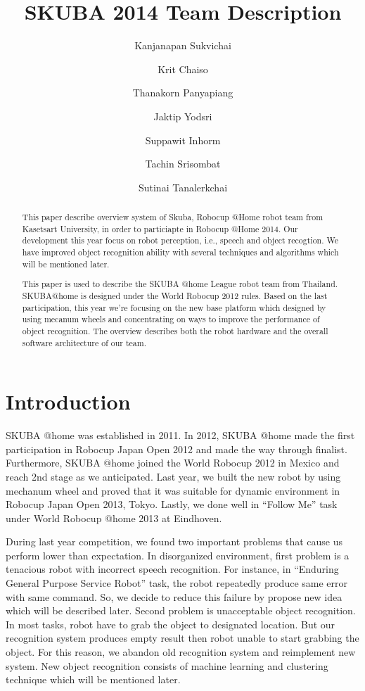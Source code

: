 \documentclass{llncs}
\newcommand{\dq}[1]{``#1''}
\begin{document}
\title{SKUBA 2014 Team Description}
\author{Kanjanapan Sukvichai
\and Krit Chaiso
\and Thanakorn Panyapiang
\and Jaktip Yodsri
\and Suppawit Inhorm
\and Tachin Srisombat
\and Sutinai Tanalerkchai
}


\maketitle

\begin{abstract}
This paper describe overview system of Skuba, Robocup @Home robot team from Kasetsart University, in order to particiapte in Robocup @Home 2014. Our development this year focus on robot perception, i.e., speech and object recogtion. We have improved object recognition ability with several techniques and algorithms which will be mentioned later. 

This paper is used to describe the SKUBA @home League robot team from Thailand.
SKUBA@home is designed under the World Robocup 2012 rules. 
Based on the last participation, this year we're focusing on the new base platform which designed by using mecanum wheels and concentrating on ways to improve the performance of object recognition.
The overview describes both the robot hardware and the overall software architecture of our team.
\end{abstract}

\section{Introduction}

SKUBA @home was established in 2011. In 2012, SKUBA @home made the first participation in Robocup Japan Open 2012 and made the way through finalist. Furthermore, SKUBA @home joined the World Robocup 2012 in Mexico and reach 2nd stage as we anticipated. Last year, we built the new robot by using mechanum wheel and proved that it was suitable for dynamic environment in Robocup Japan Open 2013, Tokyo. Lastly, we done well in \dq{Follow Me} task under World Robocup @home 2013 at Eindhoven.

During last year competition, we found two important problems that cause us perform lower than expectation. In disorganized environment, first problem is a tenacious robot with incorrect speech recognition. For instance, in \dq{Enduring General Purpose Service Robot} task, the robot repeatedly produce same error with same command. So, we decide to reduce this failure by propose new idea which will be described later. Second problem is unacceptable object recognition. In most tasks, robot have to grab the object to designated location. But our recognition system produces empty result then robot unable to start grabbing the object. For this reason, we abandon old recognition system and reimplement new system. New object recognition consists of machine learning and clustering technique which will be mentioned later.
\end{document}
